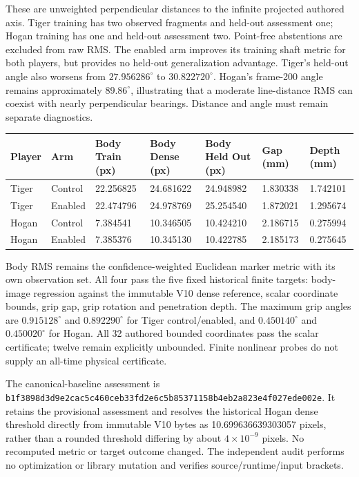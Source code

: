 \documentclass[11pt,letterpaper]{article}
\newcommand{\hash}[1]{{\footnotesize\nolinkurl{#1}}}
\begin{document}
These are unweighted perpendicular distances to the infinite projected authored
axis. Tiger training has two observed fragments and held-out assessment one;
Hogan training has one and held-out assessment two. Point-free abstentions are
excluded from raw RMS. The enabled arm improves its training shaft metric for
both players, but provides no held-out generalization advantage. Tiger's
held-out angle also worsens from $27.956286^\circ$ to $30.822720^\circ$.
Hogan's frame-200 angle remains approximately $89.86^\circ$, illustrating
that a moderate line-distance RMS can coexist with nearly perpendicular
bearings. Distance and angle must remain separate diagnostics.

\begin{longtable}{@{}p{0.55in}p{0.68in}p{0.75in}p{0.75in}p{0.75in}p{0.68in}p{0.70in}@{}}
\toprule Player & Arm & Body Train (px) & Body Dense (px) & Body Held Out (px) & Gap (mm) & Depth (mm)\\
\midrule\endhead
Tiger & Control & 22.256825 & 24.681622 & 24.948982 & 1.830338 & 1.742101\\
Tiger & Enabled & 22.474796 & 24.978769 & 25.254540 & 1.872021 & 1.295674\\
Hogan & Control & 7.384541 & 10.346505 & 10.424210 & 2.186715 & 0.275994\\
Hogan & Enabled & 7.385376 & 10.345130 & 10.422785 & 2.185173 & 0.275645\\
\bottomrule
\end{longtable}
Body RMS remains the confidence-weighted Euclidean marker metric with its
own observation set. All four pass the five fixed historical finite targets:
body-image regression against the immutable V10 dense reference, scalar
coordinate bounds, grip gap, grip rotation and penetration depth. The maximum
grip angles are $0.915128^\circ$ and $0.892290^\circ$ for Tiger control/enabled,
and $0.450140^\circ$ and $0.450020^\circ$ for Hogan. All 32 authored bounded
coordinates pass the scalar certificate; twelve remain explicitly unbounded.
Finite nonlinear probes do not supply an all-time physical certificate.

The canonical-baseline assessment is
\hash{b1f3898d3d9e2cac5c460ceb33fd2e6c5b85371158b4eb2a823e4f027ede002e}.
It retains the provisional assessment and resolves the historical Hogan dense
threshold directly from immutable V10 bytes as 10.699636639303057 pixels,
rather than a rounded threshold differing by about $4\times10^{-9}$ pixels.
No recomputed metric or target outcome changed. The independent audit performs
no optimization or library mutation and verifies source/runtime/input brackets.
\end{document}
